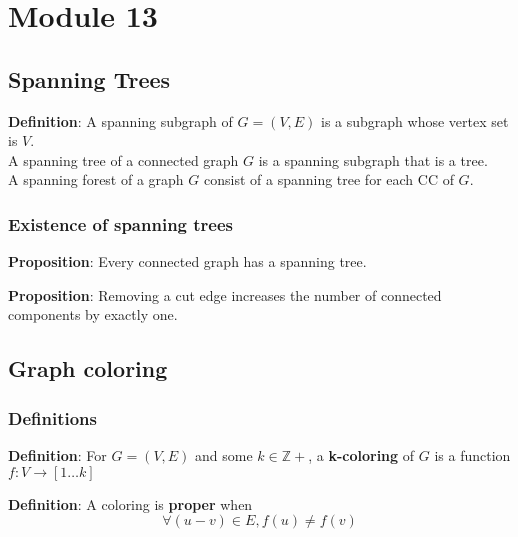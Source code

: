 \chapter{Module 13}

\section{Spanning Trees}

\begin{framed}
   \textbf{Definition}: A spanning subgraph of $G = (V, E)$ is a subgraph whose vertex set is $V$. \\

   A spanning tree of a connected graph $G$ is a spanning subgraph that is a tree. \\

   A spanning forest of a graph $G$ consist of a spanning tree for each CC of $G$. 
\end{framed}

\subsection{Existence of spanning trees}

\begin{framed}
   \textbf{Proposition}: Every connected graph has a spanning tree. 
\end{framed}

\begin{framed}
   \textbf{Proposition}: Removing a cut edge increases the number of connected components by exactly one. 
\end{framed}


\section{Graph coloring}

\subsection{Definitions}

\begin{framed}
   \textbf{Definition}: For $G = (V, E)$ and some $k \in \mathbb{Z}+$, a \textbf{k-coloring} of $G$ is a function $f : V \rightarrow [1 \hdots k]$ 
\end{framed}

\begin{framed}
   \textbf{Definition}: A coloring is \textbf{proper} when 
   \[
     \forall (u-v) \in E, f(u) \neq f(v)
   \] 
\end{framed}

